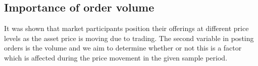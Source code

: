 
\subsection{Importance of order volume}
\label{sec:data-hypthesis-order-volume}

It was shown that market participants position their offerings at different price levels as the asset price is moving due to trading.
The second variable in posting orders is the volume and we aim to determine whether or not this is a factor which is affected during the price movement in the given sample period.


